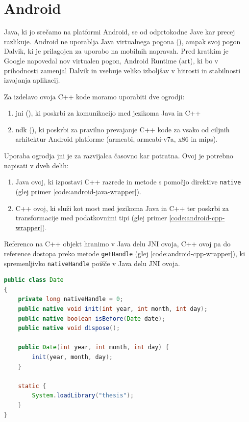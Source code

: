 \section{Android}

Java, ki jo srečamo na platformi Android, se od odprtokodne Jave kar precej razlikuje. Android ne uporablja Java virtualnega pogona (), ampak svoj pogon Dalvik, ki je prilagojen za uporabo na mobilnih napravah. Pred kratkim je Google napovedal nov virtualen pogon, Android Runtime (\gls{art}), ki bo v prihodnosti zamenjal Dalvik in vsebuje veliko izboljšav v hitrosti in stabilnosti izvajanja aplikacij.

Za izdelavo ovoja C++ kode moramo uporabiti dve ogrodji:

\begin{enumerate}
  \item \gls{jni} (), ki poskrbi za komunikacijo med jezikoma Java in C++
  \item \gls{ndk} (), ki poskrbi za pravilno prevajanje C++ kode za vsako od ciljnih arhitektur Android platforme (armeabi, armeabi-v7a, x86 in mips).
\end{enumerate}

Uporaba ogrodja \gls{jni}\cite{jni-docs} je za razvijalca časovno kar potratna. Ovoj je potrebno napisati v dveh delih:

\begin{enumerate}
  \item Java ovoj, ki izpostavi C++ razrede in metode s pomočjo direktive \texttt{native} (glej primer \ref{code:android-java-wrapper}).
  \item C++ ovoj, ki služi kot most med jezikoma Java in C++ ter poskrbi za transformacije med podatkovnimi tipi (glej primer \ref{code:android-cpp-wrapper}).
\end{enumerate}

Referenco na C++ objekt hranimo v Java delu JNI ovoja, C++ ovoj pa do reference dostopa preko metode \texttt{getHandle} (glej \ref{code:android-cpp-wrapper}), ki spremenljivko \texttt{nativeHandle} poišče v Java delu JNI ovoja.

\begin{lstlisting}[caption={Primer Java ovoja C++ razreda \texttt{Date}.}, label=code:android-java-wrapper, language=Java]
public class Date
{
	private long nativeHandle = 0;
	public native void init(int year, int month, int day);
	public native boolean isBefore(Date date);
	public native void dispose();

	public Date(int year, int month, int day) {
		init(year, month, day);
	}

	static {
		System.loadLibrary("thesis");
	}
}
\end{lstlisting}

